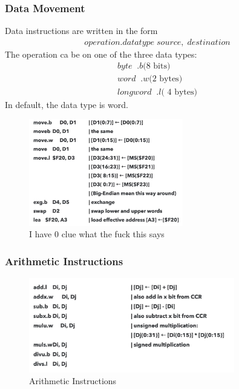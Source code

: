 \documentclass[a4paper]{article}
\theoremstyle{plain}
\theoremstyle{definition}
\theoremstyle{remark}
\begin{document}
\subsubsection{Data Movement}
Data instructions are written in the form
\begin{align*}
	operation.datatype \; source, \; destination
\end{align*}
The operation ca be on one of the three data types:
\begin{align*}
	byte \; \; .b \text{($8$ bits)} \\
	word \; \; .w \text{($2$ bytes)} \\
	long word \; \; .l \text{( $4$ bytes)}
\end{align*}
In default, the data type is word.
\begin{figure}[H]
	\centering
	\includegraphics[width=0.6\textwidth]{figures/movement.png}
	\caption{I have 0 clue what the fuck this says}
	\label{fig:figures-movement-png}
\end{figure}
\subsubsection{Arithmetic Instructions}
\begin{figure}[H]
	\centering
	\includegraphics[width=0.8\textwidth]{figures/arinst.png}
	\caption{Arithmetic Instructions}
	\label{fig:figures-arinst-png}
\end{figure}
\end{document}
